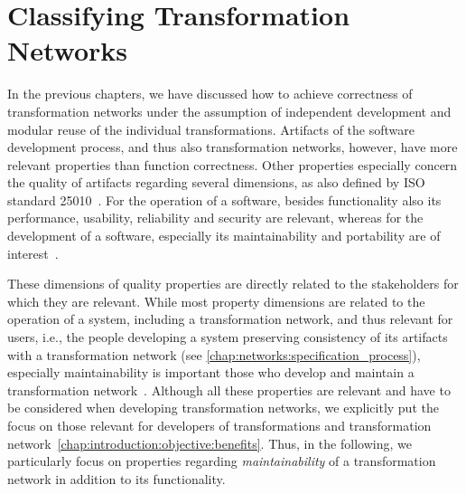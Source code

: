 \chapter{Classifying Transformation Networks
}
\label{chap:classification}

In the previous chapters, we have discussed how to achieve correctness of transformation networks under the assumption of independent development and modular reuse of the individual transformations.
Artifacts of the software development process, and thus also transformation networks, however, have more relevant properties than function correctness.
Other properties especially concern the quality of artifacts regarding several dimensions, as also defined by ISO standard 25010~\cite{iso25010}.
For the operation of a software, besides functionality also its performance, usability, reliability and security are relevant, whereas for the development of a software, especially its maintainability and portability are of interest~\cite[Tab. 2]{iso25010}.

These dimensions of quality properties are directly related to the stakeholders for which they are relevant.
While most property dimensions are related to the operation of a system, including a transformation network, and thus relevant for users, i.e., the people developing a system preserving consistency of its artifacts with a transformation network (see \autoref{chap:networks:specification_process}), especially maintainability is important those who develop and maintain a transformation network~\cite[Tab. 2]{iso25010}.
Although all these properties are relevant and have to be considered when developing transformation networks, we explicitly put the focus on those relevant for developers of transformations and transformation network~\autoref{chap:introduction:objective:benefits}.
Thus, in the following, we particularly focus on properties regarding \emph{maintainability} of a transformation network in addition to its functionality.

